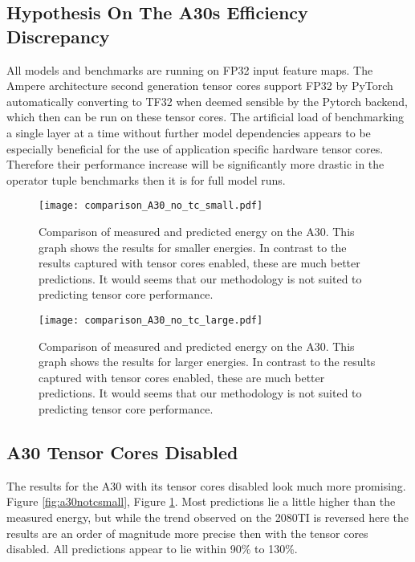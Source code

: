 \documentclass[conference]{IEEEtran}
\begin{document}
\subsection{Hypothesis On The A30s Efficiency Discrepancy}
All models and benchmarks are running on FP32 input feature maps. The Ampere architecture second generation tensor cores support FP32 by PyTorch automatically converting to TF32 when deemed sensible by the Pytorch backend, which then can be run on these tensor cores. The artificial load of 
benchmarking a single layer at a time without further model dependencies appears to be especially beneficial for the use of application specific hardware tensor cores. Therefore their performance increase will be significantly more drastic in the operator tuple benchmarks then it is for full model runs.

\begin{figure}
    \texttt{[image: comparison\_A30\_no\_tc\_small.pdf]}
    \caption{Comparison of measured and predicted energy on the A30. This graph shows the results for smaller energies. In contrast to the results captured with tensor cores enabled, these are much better predictions. It would seems that our methodology is not suited to predicting tensor core performance.}
    \label{fig:a30notcsmall}
    \texttt{[image: comparison\_A30\_no\_tc\_large.pdf]}
    \caption{Comparison of measured and predicted energy on the A30. This graph shows the results for larger energies. In contrast to the results captured with tensor cores enabled, these are much better predictions. It would seems that our methodology is not suited to predicting tensor core performance.}
    \label{fig:a30notclarge}
\end{figure}

\subsection{A30 Tensor Cores Disabled}
The results for the A30 with its tensor cores disabled look much more promising. Figure \ref{fig:a30notcsmall}, Figure \ref{fig:a30notclarge}. Most predictions lie a little higher than the measured energy, but while the trend observed on the 2080TI is reversed here the results are an order of magnitude more precise then with the tensor cores disabled. All predictions appear to lie within 90\% to 130\%.
\end{document}
